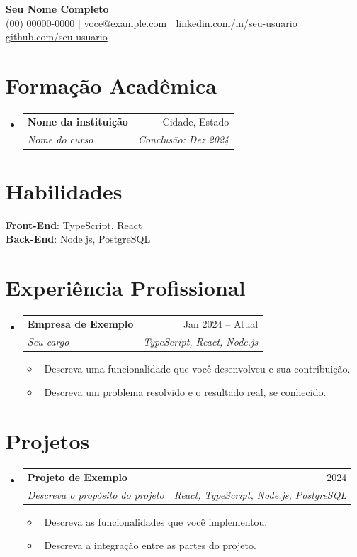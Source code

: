 \documentclass[letterpaper,10pt]{article}
\makeatletter
\newcommand{\resumeItem}[1]{\item\small{#1}}
\newcommand{\resumeSubheading}[4]{
  \vspace{-1pt}\item
  \begin{tabular*}{0.97\textwidth}[t]{l@{\extracolsep{\fill}}r}
    \textbf{#1} & #2 \\
    \textit{#3} & \textit{#4} \\
  \end{tabular*}\vspace{-7pt}
}
\newcommand{\resumeSubHeadingList}{\begin{itemize}[leftmargin=0.15in, label={}]}
\newcommand{\resumeSubHeadingListEnd}{\end{itemize}}
\makeatother
\begin{document}
\begin{center}
  \textbf{\Huge Seu Nome Completo} \\
  \small (00) 00000-0000 $|$
  \href{mailto:voce@example.com}{voce@example.com} $|$
  \href{https://www.linkedin.com/in/seu-usuario/}{linkedin.com/in/seu-usuario} $|$
  \href{https://github.com/seu-usuario}{github.com/seu-usuario}
\end{center}

\section{Formação Acadêmica}
\resumeSubHeadingList
  \resumeSubheading
    {Nome da instituição}{Cidade, Estado}
    {Nome do curso}{Conclusão: Dez 2024}
\resumeSubHeadingListEnd

\section{Habilidades}
\begin{itemize}[leftmargin=0.15in, label={}]
  \small{\item{
    \textbf{Front-End}{: TypeScript, React} \\
    \textbf{Back-End}{: Node.js, PostgreSQL}
  }}
\end{itemize}

\section{Experiência Profissional}
\resumeSubHeadingList
  \resumeSubheading
    {Empresa de Exemplo}{Jan 2024 -- Atual}
    {Seu cargo}{TypeScript, React, Node.js}
  \resumeSubHeadingList
    \resumeItem{\textbullet\ Descreva uma funcionalidade que você desenvolveu e sua contribuição.}
    \resumeItem{\textbullet\ Descreva um problema resolvido e o resultado real, se conhecido.}
  \resumeSubHeadingListEnd
\resumeSubHeadingListEnd

\section{Projetos}
\resumeSubHeadingList
  \resumeSubheading
    {Projeto de Exemplo}{2024}
    {Descreva o propósito do projeto}{React, TypeScript, Node.js, PostgreSQL}
  \resumeSubHeadingList
    \resumeItem{\textbullet\ Descreva as funcionalidades que você implementou.}
    \resumeItem{\textbullet\ Descreva a integração entre as partes do projeto.}
  \resumeSubHeadingListEnd
\resumeSubHeadingListEnd

\end{document}
